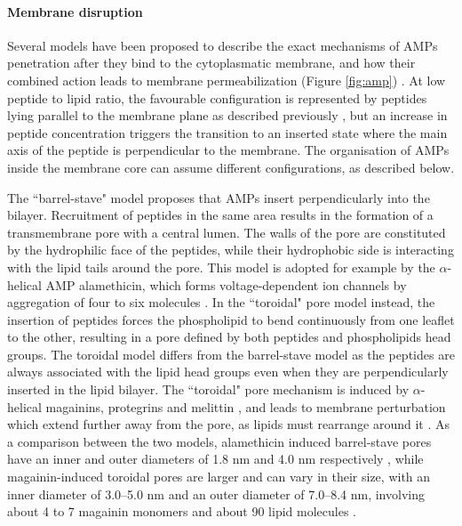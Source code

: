 \paragraph{Membrane disruption} Several models have been proposed to describe the exact mechanisms of AMPs penetration after they bind to the cytoplasmatic membrane, and how their combined action leads to membrane permeabilization (Figure \ref{fig:amp}) \cite{Brogden2005,Toke2005,Nguyen2011}.
%
At low peptide to lipid ratio, the favourable configuration is represented by peptides lying parallel to the membrane plane as described previously \cite{Yang2001}, but an increase in peptide concentration triggers the transition to an inserted state where the main axis of the peptide is perpendicular to the membrane. The organisation of AMPs inside the membrane core can assume different configurations, as described below.

The ``barrel-stave" model proposes that AMPs insert perpendicularly into the bilayer. Recruitment of peptides in the same area results in the formation of a transmembrane pore with a central lumen. The walls of the pore are constituted by the hydrophilic face of the peptides, while their hydrophobic side is interacting with the lipid tails around the pore. This model is adopted for example by the $\alpha$-helical AMP alamethicin, which forms voltage-dependent ion channels by aggregation of four to six molecules \cite{Bertelsen2012,Yang2001,Lee2004,Spaar2004}.
%
In the ``toroidal" pore model instead, the insertion of peptides forces the phospholipid to bend continuously from one leaflet to the other, resulting in a pore defined by both peptides and phospholipids head groups. The toroidal model differs from the barrel-stave model as the peptides are always associated with the lipid head groups even when they are perpendicularly inserted in the lipid  bilayer. The ``toroidal" pore mechanism is induced by $\alpha$-helical magainins, protegrins and melittin \cite{Yang2001,Matsuzaki1996,Hallock2003}, and leads to membrane perturbation which extend further away from the pore, as lipids must rearrange around it \cite{Bertelsen2012}.
%
As a comparison between the two models, alamethicin induced barrel-stave pores have an inner and outer diameters of 1.8 nm and 4.0 nm respectively \cite{Spaar2004,He1995}, while magainin-induced toroidal pores are larger and can vary in their size, with an inner diameter of 3.0–5.0 nm and an outer diameter of 7.0–8.4 nm, involving about 4 to 7 magainin monomers and about 90 lipid molecules \cite{Matsuzaki1998,Matsuzaki1997}.

